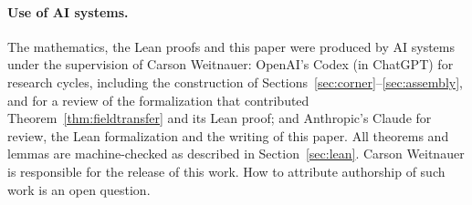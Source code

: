 \documentclass[11pt]{article}
\theoremstyle{definition}
\theoremstyle{remark}
\begin{document}
\paragraph{Use of AI systems.} The mathematics, the Lean proofs and this paper were produced by AI systems under
the supervision of Carson Weitnauer: OpenAI's Codex (in ChatGPT) for research cycles, including the construction of
Sections~\ref{sec:corner}--\ref{sec:assembly}, and for a review of the formalization that contributed
Theorem~\ref{thm:fieldtransfer} and its Lean proof; and Anthropic's Claude for review, the Lean formalization and
the writing of this paper. All theorems and lemmas are machine-checked as described in Section~\ref{sec:lean}.
Carson Weitnauer is responsible for the release of this work. How to attribute authorship of such work is an open
question.
\end{document}
